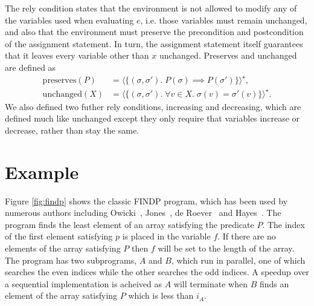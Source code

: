 \documentclass{llncs}
\begin{document}
The rely condition states that the environment is not allowed to
modify any of the variables used when evaluating $e$, i.e. those
variables must remain unchanged, and also that the environment must
preserve the precondition and postcondition of the assignment
statement. In turn, the assignment statement itself guarantees that it
leaves every variable other than $x$ unchanged. Preserves and unchanged are defined as
\begin{align*}
\text{preserves}(P) &= \langle \{(\sigma,\sigma').\; P(\sigma) \implies P(\sigma')\}\rangle^\star,\\
\text{unchanged}(X) &= \langle \{(\sigma,\sigma').\; \forall v\in X.\; \sigma(v) = \sigma'(v)\}\rangle^\star.
\end{align*}
We also defined two futher rely conditions, increasing and decreasing,
which are defined much like unchanged except they only require that variables
increase or decrease, rather than stay the same.

\newpage
\section{Example}

Figure \ref{fig:findp} shows the classic FINDP program, which has been
used by numerous authors including Owicki~\cite{owicki},
Jones~\cite{jones}, de Roever~\cite{derover} and
Hayes~\cite{hayes}. The program finds the least element of an array
satisfying the predicate $P$. The index of the first element
satisfying $p$ is placed in the variable $f$. If there are no elements
of the array satisfying $P$ then $f$ will be set to the length of the
array. The program has two subprograms, $A$ and $B$, which run in
parallel, one of which searches the even indices while the other
searches the odd indices. A speedup over a sequential implementation
is acheived as $A$ will terminate when $B$ finds an element of the
array satisfying $P$ which is less than $i_A$.
\end{document}
